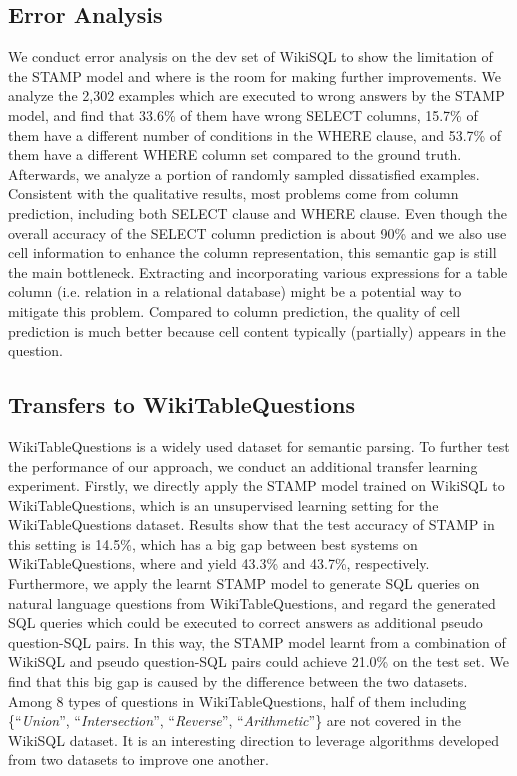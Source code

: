 \documentclass[11pt,a4paper]{article}
\begin{document}
\subsection{Error Analysis}
We conduct error analysis on the dev set of WikiSQL to show the limitation of the STAMP model and where is the room for making further improvements.
We analyze the 2,302 examples which are executed to wrong answers by the STAMP model, and find that 33.6\% of them have wrong SELECT columns, 15.7\%  of them have a different number of conditions in the WHERE clause, and 53.7\% of them have a different WHERE column set compared to the ground truth.
Afterwards, we analyze a portion of randomly sampled dissatisfied examples.
Consistent with the qualitative results, most problems come from column prediction, including both SELECT clause and WHERE clause. Even though the overall accuracy of the SELECT column prediction is about 90\% and we also use cell information to enhance the column representation, this semantic gap is still the main bottleneck.
Extracting and incorporating various expressions for a table column (i.e. relation in a relational database) might be a potential way to mitigate this problem.
Compared to column prediction, the quality of cell prediction is much better because cell content typically (partially) appears in the question.

\subsection{Transfers to WikiTableQuestions}
WikiTableQuestions \cite{pasupat-liang:2015:ACL-IJCNLP} is a widely used dataset for semantic parsing.
To further test the performance of our approach, we conduct an additional transfer learning \mbox{experiment}.
Firstly, we directly apply the STAMP model trained on WikiSQL to WikiTableQuestions, which is an unsupervised learning setting for the WikiTableQuestions dataset.
Results show that the test accuracy of STAMP in this setting is 14.5\%, which has a big gap between best systems on  WikiTableQuestions, where  and  yield 43.3\% and 43.7\%, respectively.
Furthermore, we apply the learnt STAMP model to generate SQL queries on natural language questions from WikiTableQuestions, and regard the generated SQL queries which could be executed to correct answers as additional pseudo question-SQL pairs. 
In this way, the STAMP model learnt from a combination of WikiSQL and pseudo question-SQL pairs could achieve 21.0\% on the test set.
We find that this big gap is caused by the difference between the two datasets.
Among 8 types of questions in WikiTableQuestions, half of them including \{``\textit{Union}'', ``\textit{Intersection}'', ``\textit{Reverse}'', ``\textit{Arithmetic}''\} are not covered in the WikiSQL dataset.
It is an interesting direction to leverage algorithms developed from two datasets to improve one another. 
\end{document}
